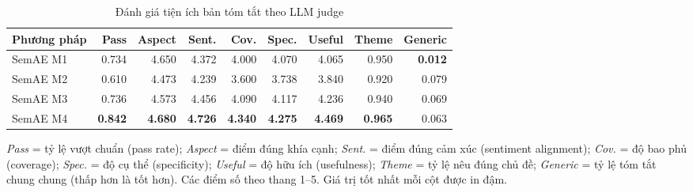 \begin{table}[H]
\centering
\caption{Đánh giá tiện ích bản tóm tắt theo LLM judge}
\label{tab:summary-utility}
\begin{threeparttable}
\small
\begin{tabular}{l r r r r r r r r}
\toprule
\textbf{Phương pháp} & \textbf{Pass} & \textbf{Aspect} & \textbf{Sent.} & \textbf{Cov.} & \textbf{Spec.} & \textbf{Useful} & \textbf{Theme} & \textbf{Generic} \\
\midrule
SemAE M1 & 0.734 & 4.650 & 4.372 & 4.000 & 4.070 & 4.065 & 0.950 & \textbf{0.012} \\
SemAE M2 & 0.610 & 4.473 & 4.239 & 3.600 & 3.738 & 3.840 & 0.920 & 0.079 \\
SemAE M3 & 0.736 & 4.573 & 4.456 & 4.090 & 4.117 & 4.236 & 0.940 & 0.069 \\
SemAE M4 & \textbf{0.842} & \textbf{4.680} & \textbf{4.726} & \textbf{4.340} & \textbf{4.275} & \textbf{4.469} & \textbf{0.965} & 0.063 \\
\bottomrule
\end{tabular}
\begin{tablenotes}
\footnotesize
\item \textit{Pass} = tỷ lệ vượt chuẩn (pass rate); \textit{Aspect} = điểm đúng khía cạnh; \textit{Sent.} = điểm đúng cảm xúc (sentiment alignment); \textit{Cov.} = độ bao phủ (coverage); \textit{Spec.} = độ cụ thể (specificity); \textit{Useful} = độ hữu ích (usefulness); \textit{Theme} = tỷ lệ nêu đúng chủ đề; \textit{Generic} = tỷ lệ tóm tắt chung chung (thấp hơn là tốt hơn). Các điểm số theo thang 1--5. Giá trị tốt nhất mỗi cột được in đậm.
\end{tablenotes}
\end{threeparttable}
\end{table}

